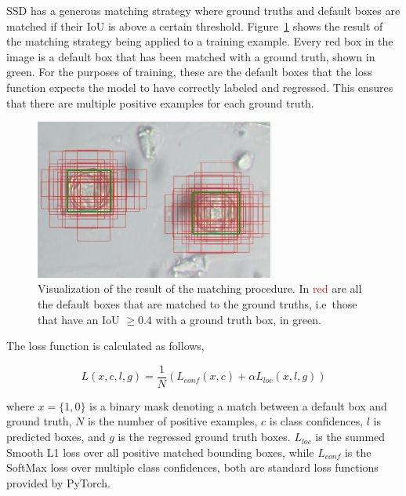 SSD has a generous matching strategy where ground truths and default boxes are matched if their IoU is above a certain threshold.
Figure~\ref{fig:priors} shows the result of the matching strategy being applied to a training example.
Every red box in the image is a default box that has been matched with a ground truth, shown in green.
For the purposes of training, these are the default boxes that the loss function expects the model to have correctly labeled and regressed.
This ensures that there are multiple positive examples for each ground truth.

\begin{figure}[htbp]
  \centering
  \includegraphics[width=0.7\textwidth]{figs/method/priors_matching.png}
  \caption[Default box matching]{Visualization of the result of the matching procedure.
In \textcolor{red}{red} are all the default boxes that are matched to the ground truths, i.e\ those that have an IoU \( \geq 0.4 \) with a ground truth box, in \textcolor{nicegreen}{green}.}\label{fig:priors}
\end{figure}


The loss function is calculated as follows,

\begin{equation}\label{eq:loss}
  L(x,c,l,g)=\frac{1}{N}\left( L_{conf}(x,c) + \alpha L_{loc}(x,l,g)\right)
\end{equation}

where \( x=\{1,0\} \) is a binary mask denoting a match between a default box and ground truth, \( N \) is the number of positive examples, \( c \) is class confidences, \( l \) is predicted boxes, and \( g \) is the regressed ground truth boxes.  \( L_{loc} \) is the summed Smooth L1 loss over all positive matched bounding boxes, while \( L_{conf} \) is the SoftMax loss over multiple class confidences, both are standard loss functions provided by PyTorch.

